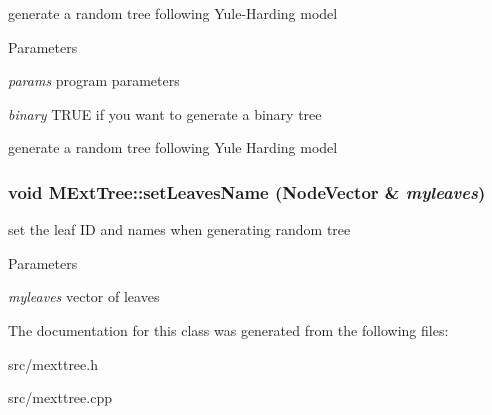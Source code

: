 \label{classMExtTree_a9e048ce7a85817ff65dabe6a739ab1d0}
generate a random tree following Yule-\/Harding model 
\begin{DoxyParams}{Parameters}
\item[{\em params}]program parameters \item[{\em binary}]TRUE if you want to generate a binary tree\end{DoxyParams}
generate a random tree following Yule Harding model \hypertarget{classMExtTree_a690a4da143b341b8969c9d176a221984}{
\subsubsection[{setLeavesName}]{\setlength{\rightskip}{0pt plus 5cm}void MExtTree::setLeavesName (NodeVector \& {\em myleaves})}}
\label{classMExtTree_a690a4da143b341b8969c9d176a221984}
set the leaf ID and names when generating random tree 
\begin{DoxyParams}{Parameters}
\item[{\em myleaves}]vector of leaves \end{DoxyParams}


The documentation for this class was generated from the following files:\begin{DoxyCompactItemize}
\item 
src/mexttree.h\item 
src/mexttree.cpp\end{DoxyCompactItemize}
